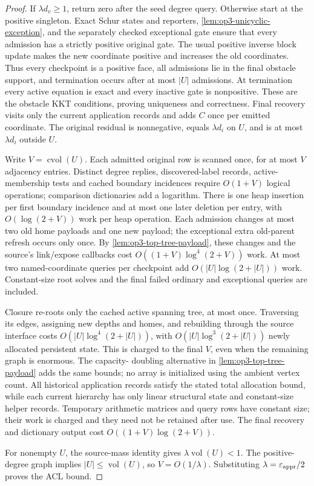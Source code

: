\begin{proof}
If $\lambda d_v\geq1$, return zero after the seed degree query. Otherwise
start at the positive singleton. Exact Schur states and reporters,
\cref{lem:op3-unicyclic-exception}, and the separately checked exceptional
gate ensure that every admission has a strictly positive original gate.
The usual positive inverse block update makes the new coordinate positive
and increases the old coordinates. Thus every checkpoint is a positive
face, all admissions lie in the final obstacle support, and termination
occurs after at most $|U|$ admissions. At termination every active equation
is exact and every inactive gate is nonpositive. These are the obstacle KKT
conditions, proving uniqueness and correctness. Final recovery visits only
the current application records and adds $C$ once per emitted coordinate.
The original residual is nonnegative, equals $\lambda d_i$ on $U$, and is
at most $\lambda d_i$ outside $U$.

Write $V=\operatorname{cvol}(U)$. Each admitted original row is scanned once,
for at most $V$ adjacency entries. Distinct degree replies, discovered-label
records, active-membership tests and cached boundary incidences require
$O(1+V)$ logical operations; comparison dictionaries add a logarithm.
There is one heap insertion per first boundary incidence and at most one
later deletion per entry, with $O(\log(2+V))$ work per heap operation.
Each admission changes at most two old home payloads and one new payload;
the exceptional extra old-parent refresh occurs only once. By
\cref{lem:op3-top-tree-payload}, these changes and the source's link/expose
callbacks cost $O((1+V)\log^4(2+V))$ work. At most two named-coordinate
queries per checkpoint add $O(|U|\log(2+|U|))$ work. Constant-size root
solves and the final failed ordinary and exceptional queries are included.

Closure re-roots only the cached active spanning tree, at most once.
Traversing its edges, assigning new depths and homes, and rebuilding through
the source interface costs $O(|U|\log^4(2+|U|))$, with
$O(|U|\log^3(2+|U|))$ newly allocated persistent state. This is charged to
the final $V$, even when the remaining graph is enormous. The capacity-
doubling alternative in \cref{lem:op3-top-tree-payload} adds the same bounds;
no array is initialized using the ambient vertex count. All historical
application records satisfy the stated total allocation bound, while each
current hierarchy has only linear structural state and constant-size helper
records. Temporary arithmetic matrices and query rows have constant size;
their work is charged and they need not be retained after use. The final
recovery and dictionary output cost $O((1+V)\log(2+V))$.

For nonempty $U$, the source-mass identity gives $\lambda\operatorname{vol}(U)<1$.
The positive-degree graph implies $|U|\leq\operatorname{vol}(U)$, so
$V=O(1/\lambda)$. Substituting $\lambda=\varepsilon_{\mathrm{appr}}/2$ proves the ACL bound.
\end{proof}

